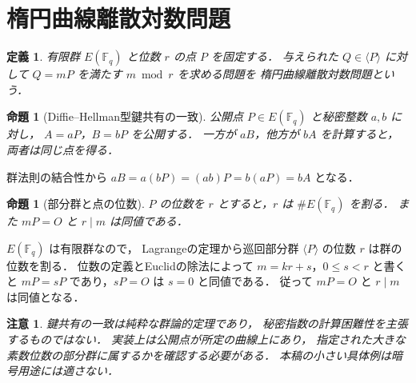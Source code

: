 \documentclass[a5paper,10pt,onecolumn]{jsarticle}
\makeatletter
\theoremstyle{mathnotetheorem}
\newtheorem{definition}[theorem]{定義}
\newtheorem{proposition}[theorem]{命題}
\newtheorem{remark}[theorem]{注意}
\renewcommand{\proofname}{証明}
\renewenvironment{proof}[1][\proofname]{%
  \par\pushQED{\qed}\normalfont\topsep4\p@\@plus2\p@\relax
  \trivlist\item[\hskip\labelsep\bfseries #1]\ignorespaces
}{\popQED\endtrivlist\@endpefalse}
\makeatother
\begin{document}
\section{楕円曲線離散対数問題}

\begin{definition}
有限群 $E(\mathbb F_q)$ と位数 $r$ の点 $P$ を固定する．
与えられた $Q\in\langle P\rangle$ に対して
$Q=mP$ を満たす $m\bmod r$ を求める問題を
\emph{楕円曲線離散対数問題}という．
\end{definition}

\begin{proposition}[Diffie--Hellman型鍵共有の一致]
\label{prop:ecdh}
公開点 $P\in E(\mathbb F_q)$ と秘密整数 $a,b$ に対し，
$A=aP$，$B=bP$ を公開する．
一方が $aB$，他方が $bA$ を計算すると，
両者は同じ点を得る．
\end{proposition}
\begin{proof}
群法則の結合性から
$aB=a(bP)=(ab)P=b(aP)=bA$ となる．
\end{proof}

\begin{proposition}[部分群と点の位数]
\label{prop:order}
$P$ の位数を $r$ とすると，$r$ は
$\#E(\mathbb F_q)$ を割る．
また $mP=O$ と $r\mid m$ は同値である．
\end{proposition}
\begin{proof}
$E(\mathbb F_q)$ は有限群なので，
Lagrangeの定理から巡回部分群 $\langle P\rangle$ の位数
$r$ は群の位数を割る．
位数の定義とEuclidの除法によって
$m=kr+s$，$0\le s<r$ と書くと
$mP=sP$ であり，$sP=O$ は $s=0$ と同値である．
従って $mP=O$ と $r\mid m$ は同値となる．
\end{proof}

\begin{remark}
鍵共有の一致は純粋な群論的定理であり，
秘密指数の計算困難性を主張するものではない．
実装上は公開点が所定の曲線上にあり，
指定された大きな素数位数の部分群に属するかを確認する必要がある．
本稿の小さい具体例は暗号用途には適さない．
\end{remark}
\end{document}
